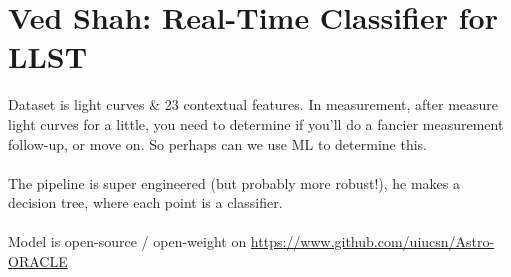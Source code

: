 \section{Ved Shah: Real-Time Classifier for LLST}
Dataset is light curves \& 23 contextual features. In measurement, after measure light curves for a little, you need to determine if you'll do a fancier measurement follow-up, or move on. So perhaps can we use ML to determine this.\\
\\
The pipeline is super engineered (but probably more robust!), he makes a decision tree, where each point is a classifier.\\
\\
Model is open-source / open-weight on \url{https://www.github.com/uiucsn/Astro-ORACLE}
















